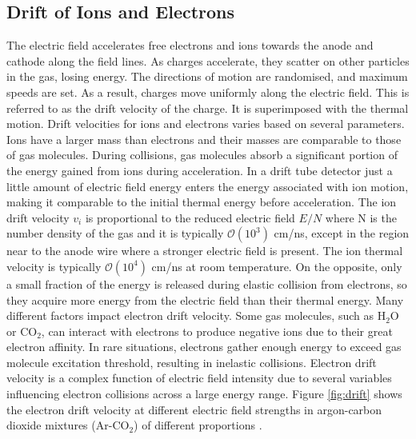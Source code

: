 \subsection{Drift of Ions and Electrons}
The electric field accelerates free electrons and ions towards the anode and cathode 
along the field lines. As charges accelerate, they scatter on other particles in the gas, 
losing energy. The directions of motion are randomised, and maximum speeds are set. As a result, 
charges move uniformly along the electric field. This is referred to as the drift velocity of the 
charge. It is superimposed with the thermal motion.
Drift velocities for ions and electrons varies based on several parameters. Ions have a larger mass 
than electrons and their masses are comparable to those of gas molecules. During collisions, gas 
molecules absorb a significant portion of the energy gained from ions during acceleration. In a drift 
tube detector just a little amount of electric field energy enters the energy associated with ion motion, 
making it comparable to the initial thermal energy before acceleration. 
The ion drift velocity $v_i$ is proportional to the reduced electric field $E/N$ where N is the number density of the gas 
and it is typically $\mathcal{O}(10^3)$ cm/ns, except in the region near to the anode wire where a stronger 
electric field is present. The ion thermal velocity is typically $\mathcal{O}(10^4)$ cm/ns at room temperature.
On the opposite, only a small fraction of the energy is released during elastic collision from electrons, 
so they acquire more energy from the electric field than their thermal energy.
Many different factors impact electron drift velocity. Some gas molecules, such as H$_2$O or CO$_2$, 
can interact with electrons to produce negative ions due to their great electron affinity. In rare situations, 
electrons gather enough energy to exceed gas molecule excitation threshold, resulting in inelastic collisions. 
Electron drift velocity is a complex function of electric field intensity due to several variables influencing 
electron collisions across a large energy range. Figure \ref{fig:drift} shows the electron drift
velocity at different electric field strengths in argon-carbon dioxide mixtures (Ar-CO$_2$) of different
proportions \cite{ZHAO1994485}.
